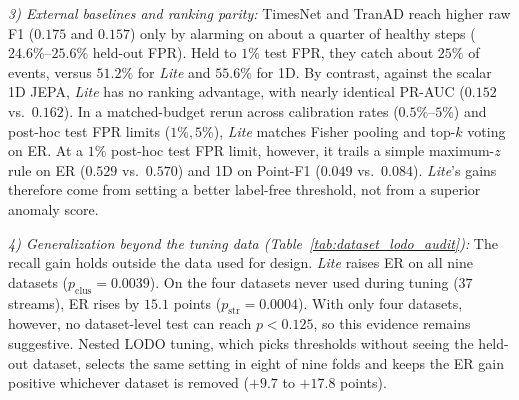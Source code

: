 \documentclass[journal]{IEEEtran}
\begin{document}
\noindent\emph{3) External baselines and ranking parity:} TimesNet and TranAD reach higher raw F1 ($0.175$ and $0.157$) only by alarming on about a quarter of healthy steps ($24.6\%\text{--}25.6\%$ held-out FPR). Held to $1\%$ test FPR, they catch about $25\%$ of events, versus $51.2\%$ for \emph{Lite} and $55.6\%$ for 1D. By contrast, against the scalar 1D JEPA, \emph{Lite} has no ranking advantage, with nearly identical PR-AUC ($0.152$ vs.\ $0.162$). In a matched-budget rerun across calibration rates ($0.5\%\text{--}5\%$) and post-hoc test FPR limits ($1\%, 5\%$), \emph{Lite} matches Fisher pooling and top-$k$ voting on ER. At a $1\%$ post-hoc test FPR limit, however, it trails a simple maximum-$z$ rule on ER ($0.529$ vs.\ $0.570$) and 1D on Point-F1 ($0.049$ vs.\ $0.084$). \emph{Lite}'s gains therefore come from setting a better label-free threshold, not from a superior anomaly score.

\noindent\emph{4) Generalization beyond the tuning data (Table~\ref{tab:dataset_lodo_audit}):} The recall gain holds outside the data used for design. \emph{Lite} raises ER on all nine datasets ($p_{\text{clus}}=0.0039$). On the four datasets never used during tuning ($37$ streams), ER rises by $15.1$ points ($p_{\text{str}}=0.0004$). With only four datasets, however, no dataset-level test can reach $p<0.125$, so this evidence remains suggestive. Nested LODO tuning, which picks thresholds without seeing the held-out dataset, selects the same setting in eight of nine folds and keeps the ER gain positive whichever dataset is removed ($+9.7$ to $+17.8$ points).
\end{document}
